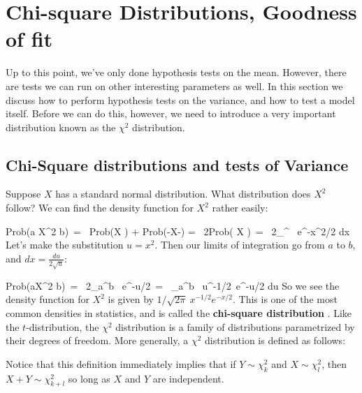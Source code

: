 \section{Chi-square Distributions, Goodness of fit} \label{sec:ChiSquare}

Up to this point, we've only done hypothesis tests on the mean.  However, there are tests we can run on other interesting parameters as well.  In this section we discuss how to perform hypothesis tests on the variance, and how to test a model itself.  Before we can do this, however, we need to introduce a very important distribution known as the $\chi^2$ distribution.


\subsection{Chi-Square distributions and tests of Variance}

Suppose $X$ has a standard normal distribution.  What distribution does $X^2$ follow?  We can find the density function for $X^2$ rather easily:

\bel
\textrm{Prob}(a \leq X^2 \leq b)\ = \ \textrm{Prob}(\leq X \leq {}) + \textrm{Prob}(-\leq X\leq -)
\eel
\bel = \ 2\cdot\textrm{Prob}( \leq X \leq {})\ = \ 2\int_{}^{} \ e^{-x^2/2} dx
\eel
Let's make the substitution $u = x^2$.  Then our limits of integration go from $a$ to $b$, and $dx = \frac{du}{2\sqrt{u}}$:

\bel
\textrm{Prob}(a\leq X^2 \leq b)\ = \ 2\int_{a}^{b} \ e^{-u/2}\ = \ \int_{a}^{b} \ u^{-1/2}\ e^{-u/2} du
\eel
So we see the density function for $X^2$ is given by $1/\sqrt{2\pi}\ x^{-1/2}e^{-x/2}$.  This is one of the most common densities in statistics, and is called the \textbf{chi-square distribution} .  Like the $t$-distribution, the $\chi^2$ distribution is a family of distributions parametrized by their degrees of freedom.  More generally, a $\chi^2$ distribution is defined as follows:

\begin{table}[h]
\begin{center}
\end{center}
\end{table}
Notice that this definition immediately implies that if $Y \sim \chi^2_k$ and $X \sim \chi^2_l$, then $X + Y \sim \chi^2_{k+l}$ so long as $X$ and $Y$ are independent.

